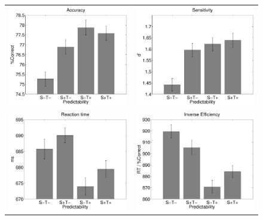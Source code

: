 \documentclass[dwyatte_dissertation.tex]{subfiles}
\begin{document}
\begin{figure}[h!]
\begin{center}
\begin{tabular}{ll}
\includegraphics[width=80mm]{figs/chap_pleast/results_accuracy.pdf} & 
\includegraphics[width=80mm]{figs/chap_pleast/results_dprime.pdf} \\
\includegraphics[width=80mm]{figs/chap_pleast/results_rt.pdf} &
\includegraphics[width=80mm]{figs/chap_pleast/results_ie.pdf} \\

\end{tabular}
\end{center}
\end{figure}
\end{document}
